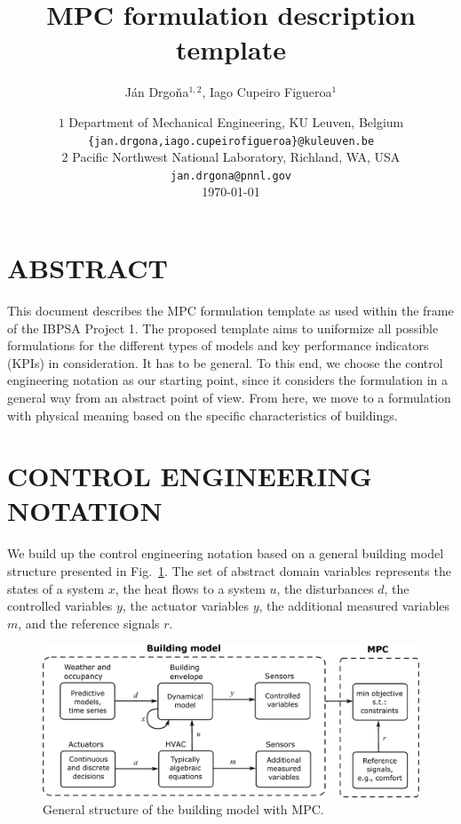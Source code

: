\documentclass[10pt]{article}
\title{MPC formulation description template}
\author{J\'an Drgo\v{n}a$^{1,2}$,  Iago Cupeiro Figueroa$^{1}$}
\date{ ${1}$ Department of Mechanical Engineering,  KU Leuven, Belgium \\
        {\tt\small \{jan.drgona,iago.cupeirofigueroa\}@kuleuven.be}  \\
            {${2}$ Pacific Northwest National Laboratory, Richland, WA, USA \\
        {\tt\small jan.drgona@pnnl.gov}} \\%
        \vspace{0.2cm}
    \today
}
\begin{document}
	
	\maketitle


\section*{ABSTRACT}

This document describes the MPC formulation template as used within the frame of the IBPSA Project 1.
The proposed template aims to uniformize all possible formulations for the different types of models and key performance indicators (KPIs) in consideration.
It has to be general.
To this end, we choose the control engineering notation as our starting point,
since it considers the formulation in a general way from an abstract point of view.
From here, we move to a formulation with physical meaning based on the specific characteristics of buildings.


%
%	


\section{CONTROL ENGINEERING NOTATION}\label{sec:control_notation}

{\color{blue} 
We build up the control engineering notation based on a general building model structure presented in
Fig.~\ref{fig:Building_model}.
The set of abstract domain variables represents the states of a system $x$, the heat flows to a system $u$, the disturbances  $d$, the controlled variables  $y$,  the actuator variables  $y$, the additional measured variables $m$, and the reference signals $r$. }
\begin{figure}[!htbp]
\centering
\includegraphics[width=0.70 \textwidth]{fig/Building_model_MPC.eps}
\caption{General structure of the building model with MPC.}
\label{fig:Building_model}
\end{figure}
\end{document}

